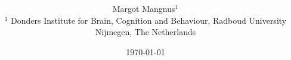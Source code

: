 \documentclass[openright,12pt,fleqn]{book} %
\title{\vspace{-15mm}\fontsize{24pt}{10pt}\selectfont\textbf{}} %
\author{
\large
{Margot Mangnus$^1$}\\[2mm] %
\small $^1$ Donders Institute for Brain, Cognition and Behaviour, Radboud University Nijmegen, The Netherlands\\ %
\vspace{-5mm}
}
\date{\today}
\newcommand\blankpage{
    \null
    \thispagestyle{empty}
    \addtocounter{page}{-1}
    \newpage}
\begin{document}
\setlength{\parindent}{0.5pt}
\renewcommand{\vec}[1]{\mathbf{#1}} %





\tableofcontents







\end{document}
